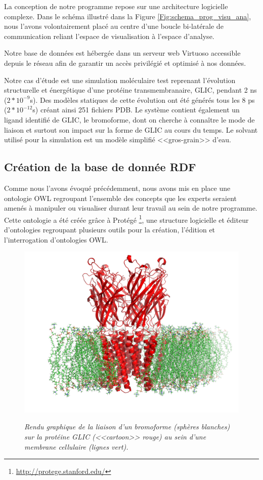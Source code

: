 La conception de notre programme repose sur une architecture logicielle complexe. Dans le schéma illustré dans la Figure \ref{Fig:schema_prog_visu_ana}, nous l'avons volontairement placé au centre d'une boucle bi-latérale de communication reliant l'espace de visualisation à l'espace d'analyse.

Notre base de données est hébergée dans un serveur web Virtuoso accessible depuis le réseau afin de garantir un accès privilégié et optimisé à nos données. 

Notre cas d'étude est une simulation moléculaire test reprenant l'évolution structurelle et énergétique d'une protéine transmembranaire, GLIC, pendant 2 ns ($2*10^{-9}$s). Des modèles statiques de cette évolution ont été générés tous les 8 ps ($2*10^{-12}$s) créant ainsi 251 fichiers PDB. Le système contient également un ligand identifié de GLIC, le bromoforme, dont on cherche à connaître le mode de liaison et surtout son impact sur la forme de GLIC au cours du temps. Le solvant utilisé pour la simulation est un modèle simplifié <<gros-grain>> d'eau.

\subsection{Création de la base de donnée RDF}

Comme nous l'avons évoqué précédemment, nous avons mis en place une ontologie OWL regroupant l'ensemble des concepts que les experts seraient amenés à manipuler ou visualiser durant leur travail au sein de notre programme. Cette ontologie a été créée grâce à Protégé \footnote{\url{http://protege.stanford.edu/}}, une structure logicielle et éditeur d'ontologies regroupant plusieurs outils pour la création, l'édition et l'interrogation d'ontologies OWL.

\begin{figure}
  \centering
  {\includegraphics[width=.75\linewidth]{./figures/ch5/glic+bromoform.pdf}}
    \caption{{\it Rendu graphique de la liaison d'un bromoforme (sphères blanches) sur la protéine GLIC (<<cartoon>> rouge) au sein d'une membrane cellulaire (lignes vert).}}
  \label{Fig:glic+bromoform}
  \hspace{0.3cm}
\end{figure}

